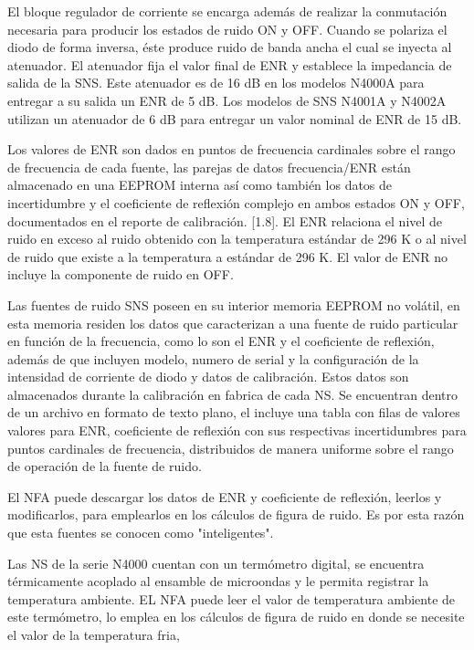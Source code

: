 	El bloque regulador de corriente se encarga además de realizar la conmutación necesaria para producir los estados de ruido ON y OFF. Cuando se polariza el diodo de forma inversa, éste produce ruido de banda ancha el cual se inyecta al atenuador. El atenuador fija el valor final de ENR y establece la impedancia de salida de la SNS. Este atenuador es de 16 dB en los modelos N4000A para entregar a  su salida un ENR de 5 dB. Los modelos de SNS N4001A y N4002A utilizan un atenuador de 6 dB para entregar un valor nominal de ENR de 15 dB.		

	Los valores de ENR son dados en puntos de frecuencia cardinales sobre el rango de frecuencia de cada fuente, las parejas de datos frecuencia/ENR están almacenado en una EEPROM interna así como también los datos de incertidumbre y el coeficiente de reflexión complejo en ambos estados ON y OFF, documentados en el reporte de calibración. [1.8]. El ENR relaciona el nivel de ruido en exceso al ruido obtenido con la temperatura estándar de 296 K o al nivel de ruido que existe a la temperatura a estándar de 296 K. El valor de ENR no incluye la componente de ruido en OFF. 
	
	Las fuentes de ruido SNS poseen en su interior memoria EEPROM no volátil, en esta memoria residen los datos que caracterizan a una fuente de ruido particular en función de la frecuencia, como lo son el ENR y el coeficiente de reflexión, además de que incluyen modelo, numero de serial y la configuración de la intensidad de corriente de diodo y datos de calibración. Estos datos son almacenados  durante la calibración en fabrica de cada NS. Se encuentran dentro de un archivo en formato de texto plano, el incluye una tabla con filas de valores valores para ENR, coeficiente de reflexión con sus respectivas incertidumbres para puntos cardinales de frecuencia, distribuidos de manera uniforme sobre el rango de operación de la fuente de ruido. 	

	El NFA puede descargar los datos de ENR y coeficiente de reflexión, leerlos y modificarlos, para emplearlos en los cálculos de figura de ruido. Es por esta razón que esta fuentes se conocen como "inteligentes".	
	
	Las NS de la serie N4000 cuentan con un termómetro digital, se encuentra térmicamente acoplado al ensamble de microondas y le permita registrar la temperatura ambiente. EL NFA puede leer el valor de temperatura ambiente de este termómetro, lo emplea en los cálculos de figura de ruido en donde se necesite el valor de la temperatura fria, 			

